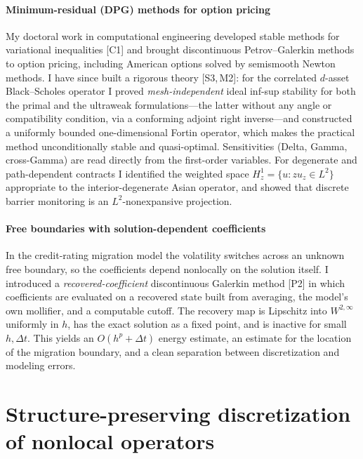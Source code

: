\documentclass[11pt]{article}
\newcommand{\rc}[1]{\textcolor{accent}{[#1]}}
\begin{document}
\paragraph{Minimum-residual (DPG) methods for option pricing}
My doctoral work in computational engineering developed stable methods for
variational inequalities \rc{C1} and brought discontinuous Petrov--Galerkin
methods to option pricing, including American options solved by semismooth Newton
methods. I have since built a rigorous theory
\rc{S3,\,M2}: for the correlated $d$-asset Black--Scholes operator I proved
\emph{mesh-independent} ideal inf-sup stability for both the primal and the
ultraweak formulations---the latter without any angle or compatibility
condition, via a conforming adjoint right inverse---and constructed a
uniformly bounded one-dimensional Fortin operator, which makes the practical
method unconditionally stable and quasi-optimal. Sensitivities (Delta, Gamma,
cross-Gamma) are read directly from the first-order variables. For degenerate
and path-dependent contracts I identified the weighted space
$H^1_z=\{u: z u_z\in L^2\}$ appropriate to the interior-degenerate Asian
operator, and showed that discrete barrier monitoring is an
$L^2$-nonexpansive projection.

\paragraph{Free boundaries with solution-dependent coefficients}
In the credit-rating migration model the volatility switches across an unknown
free boundary, so the coefficients depend nonlocally on the solution itself. I
introduced a \emph{recovered-coefficient} discontinuous Galerkin method
\rc{P2} in which coefficients are evaluated on a recovered state built from
averaging, the model's own mollifier, and a computable cutoff. The recovery map
is Lipschitz into $W^{2,\infty}$ uniformly in $h$, has the exact solution as a
fixed point, and is inactive for small $h,\Delta t$. This yields an
$O(h^p+\Delta t)$ energy estimate, an estimate for the location of the
migration boundary, and a clean separation between discretization and modeling
errors.

\section{Structure-preserving discretization of nonlocal operators}
\end{document}
